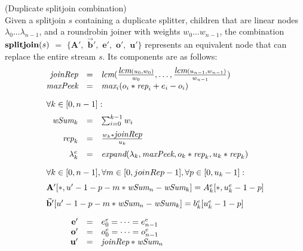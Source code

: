 \documentclass{sig-alternate}
\begin{document}
{\vspace{-6pt}
\begin{transformation} (Duplicate splitjoin combination)
\\Given a splitjoin $s$ containing a duplicate splitter, children that
are linear nodes $\lambda_0 \dots \lambda_{n-1}$, and a roundrobin
joiner with weights $w_0 \dots w_{n-1}$, the combination 
$\mbox{\bf splitjoin}(s)$ $=$ $ \{ \mathbf{A}',$ $\vec{\mathbf{b}}',$ $\mathbf{e}',$
$\mathbf{o}',$ $\mathbf{u}'\}$ represents an equivalent node that can
replace the entire stream $s$.  Its components are as follows:
\begin{equation} \nonumber
  \begin{array}{rcl}
    \mt{joinRep} & = & \mt{lcm}(\frac{\mt{lcm}(u_0,w_0)}{w_0}, \dots, \frac{\mt{lcm}(u_{n-1},w_{n-1})}{w_{n-1}}) \\
    \mt{maxPeek} & = & \mt{max}_i (o_i * \mt{rep}_i + e_i - o_i) \\ ~ \vspace{-2pt} \\
    \multicolumn{3}{l}{\forall k \in [0, n-1]:} \\ ~ \vspace{-6pt} \\
    \mt{wSum}_k & = & \sum_{i=0}^{k-1} w_i \\ ~ \vspace{-6pt} \\
    \mt{rep}_k & = & \frac{w_k * \mt{joinRep}}{u_k} \\ ~ \vspace{-6pt} \\
    \lambda_k^e & = & \mt{expand}(\lambda_k, \mt{maxPeek}, 
    o_k * \mt{rep}_k, u_k * \mt{rep}_k) \\ ~ \vspace{-2pt} \\
    \multicolumn{3}{l}{
      \forall k \in [0, n-1], 
      \forall m \in [0, joinRep-1], 
      \forall p \in [0, u_k-1]:
    } \\ ~ \vspace{-6pt} \\
    \multicolumn{3}{l}{\mathbf{A}'[*, u'-1-p - m * \mt{wSum}_{n}-\mt{wSum}_{k}] = %
      A_{k}^e [*,u_k^e-1-p]} \\ ~ \vspace{-6pt} \\
    \multicolumn{3}{l}{\vec{\mathbf{b}}'[u'-1-p - m * \mt{wSum}_{n}-\mt{wSum}_{k}] = 
      b_{k}^e [u_k^e-1-p]} \\ ~ \vspace{-2pt} \\
    \mathbf{e}' & = & e_0^e = \dots = e_{n-1}^e \\
    \mathbf{o}' & = & o_0^e = \dots = o_{n-1}^e \\
    \mathbf{u}' & = & \mt{joinRep} * \mt{wSum}_n \\
  \end{array}
\end{equation}
\end{transformation}

}
\end{document}
